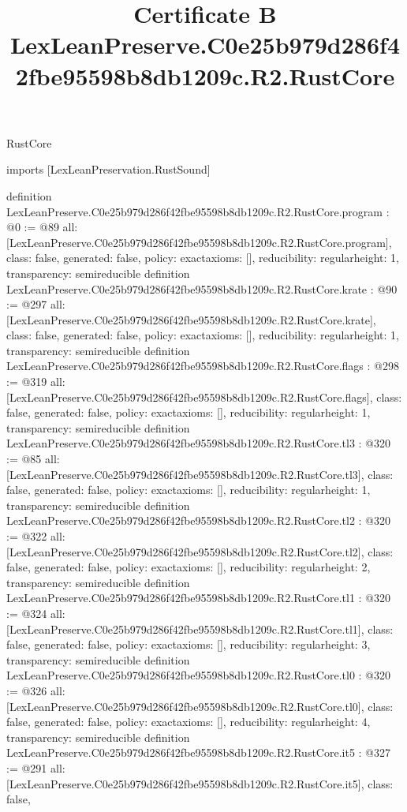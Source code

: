 \begin{lexlean}{RustCore}
\title{Certificate B LexLeanPreserve.C0e25b979d286f42fbe95598b8db1209c.R2.RustCore}
\begin{coremodule}
imports [LexLeanPreservation.RustSound]

definition LexLeanPreserve.C0e25b979d286f42fbe95598b8db1209c.R2.RustCore.program : @0 := @89 {
  all: [LexLeanPreserve.C0e25b979d286f42fbe95598b8db1209c.R2.RustCore.program],
  class: false,
  generated: false,
  policy: exact{axioms: []},
  reducibility: regular{height: 1},
  transparency: semireducible
}
definition LexLeanPreserve.C0e25b979d286f42fbe95598b8db1209c.R2.RustCore.krate : @90 := @297 {
  all: [LexLeanPreserve.C0e25b979d286f42fbe95598b8db1209c.R2.RustCore.krate],
  class: false,
  generated: false,
  policy: exact{axioms: []},
  reducibility: regular{height: 1},
  transparency: semireducible
}
definition LexLeanPreserve.C0e25b979d286f42fbe95598b8db1209c.R2.RustCore.flags : @298 := @319 {
  all: [LexLeanPreserve.C0e25b979d286f42fbe95598b8db1209c.R2.RustCore.flags],
  class: false,
  generated: false,
  policy: exact{axioms: []},
  reducibility: regular{height: 1},
  transparency: semireducible
}
definition LexLeanPreserve.C0e25b979d286f42fbe95598b8db1209c.R2.RustCore.tl3 : @320 := @85 {
  all: [LexLeanPreserve.C0e25b979d286f42fbe95598b8db1209c.R2.RustCore.tl3],
  class: false,
  generated: false,
  policy: exact{axioms: []},
  reducibility: regular{height: 1},
  transparency: semireducible
}
definition LexLeanPreserve.C0e25b979d286f42fbe95598b8db1209c.R2.RustCore.tl2 : @320 := @322 {
  all: [LexLeanPreserve.C0e25b979d286f42fbe95598b8db1209c.R2.RustCore.tl2],
  class: false,
  generated: false,
  policy: exact{axioms: []},
  reducibility: regular{height: 2},
  transparency: semireducible
}
definition LexLeanPreserve.C0e25b979d286f42fbe95598b8db1209c.R2.RustCore.tl1 : @320 := @324 {
  all: [LexLeanPreserve.C0e25b979d286f42fbe95598b8db1209c.R2.RustCore.tl1],
  class: false,
  generated: false,
  policy: exact{axioms: []},
  reducibility: regular{height: 3},
  transparency: semireducible
}
definition LexLeanPreserve.C0e25b979d286f42fbe95598b8db1209c.R2.RustCore.tl0 : @320 := @326 {
  all: [LexLeanPreserve.C0e25b979d286f42fbe95598b8db1209c.R2.RustCore.tl0],
  class: false,
  generated: false,
  policy: exact{axioms: []},
  reducibility: regular{height: 4},
  transparency: semireducible
}
definition LexLeanPreserve.C0e25b979d286f42fbe95598b8db1209c.R2.RustCore.it5 : @327 := @291 {
  all: [LexLeanPreserve.C0e25b979d286f42fbe95598b8db1209c.R2.RustCore.it5],
  class: false,
}
\end{coremodule}
\end{lexlean}
